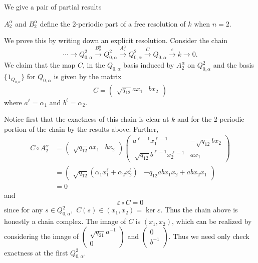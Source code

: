 \documentclass [11pt, proquest] {uwthesis}[2020/02/24]
\begin{document}
    We give a pair of partial results
    \begin{lem}\label{lem:2-dim-k-factorization}
        $A_2^\alpha$ and $B_2^\alpha$ define the 2-periodic part of a free resolution of $k$ when $n=2.$
    \end{lem}
    \begin{prf}
        We prove this by writing down an explicit resolution. Consider the chain
        \[\cdots\to Q_{0,\alpha}^2\xrightarrow{B_2^\alpha} Q_{0,\alpha}^2\xrightarrow{A_2^\alpha} Q_{0,\alpha}^2\xrightarrow{C} Q_{0,\alpha} \xrightarrow{\varepsilon}k\to 0.\]
        We claim that the map $C$, in the $Q_{0,\alpha}$ basis induced by $A_2^\alpha$ on $Q_{0,\alpha}^2$ and the basis $\{1_{Q_{0,\alpha}}\}$ for $Q_{0,\alpha}$ is given by the matrix
        \[C=\begin{pmatrix}
            \sqrt{q_{12}}a x_1 & bx_2
        \end{pmatrix}\]
        where $a^\ell=\alpha_1$ and $b^\ell=\alpha_2$.
        
        Notice first that the exactness of this chain is clear at $k$ and for the 2-periodic portion of the chain by the results above. Further, 
        \begin{align*}
            C\circ A_2^\alpha &= \begin{pmatrix}
            \sqrt{q_{12}}a x_1 & bx_2
        \end{pmatrix}\begin{pmatrix}
            a^{\ell-1}x_1^{\ell -1} & -\sqrt{q_{12}}bx_2\\ \
            \sqrt{q_{12}}b^{\ell-1}x_2^{\ell -1} & ax_1
        \end{pmatrix}\\
        &=\begin{pmatrix}
            \sqrt{q_{12}}(\alpha_1x_1^\ell + \alpha_2x_2^\ell) & -q_{12}abx_1x_2+abx_2x_1
        \end{pmatrix}\\
        &=0
        \end{align*}
        and
        \[\varepsilon\circ C = 0\]
        since for any $s\in Q_{0,\alpha}^2,$ $C(s)\in(x_1,x_2)=\ker\varepsilon $. Thus the chain above is honestly a chain complex. The image of $C$ is $(x_1,x_2)$, which can be realized by considering the image of $(\begin{smallmatrix}
            \sqrt{q_{21}}a^{-1}\\ 0
        \end{smallmatrix})$ and $(\begin{smallmatrix}
            0\\ b^{-1}
        \end{smallmatrix}).$ Thus we need only check exactness at the first $Q_{0,\alpha}^2.$
        

\end{prf}
\end{document}
